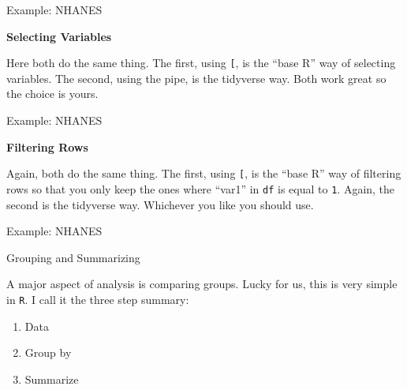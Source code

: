 \documentclass[ignorenonframetext,]{beamer}
\newenvironment{Shaded}{\begin{snugshade}}{\end{snugshade}}
\newcommand{\KeywordTok}[1]{\textcolor[rgb]{0.13,0.29,0.53}{\textbf{{#1}}}}
\newcommand{\DecValTok}[1]{\textcolor[rgb]{0.00,0.00,0.81}{{#1}}}
\newcommand{\StringTok}[1]{\textcolor[rgb]{0.31,0.60,0.02}{{#1}}}
\newcommand{\NormalTok}[1]{{#1}}
\providecommand{\tightlist}{%
\setlength{\itemsep}{0pt}\setlength{\parskip}{0pt}}
\begin{document}
\begin{frame}[fragile]{Example: NHANES}

\textbf{Selecting Variables}

\begin{Shaded}
\end{Shaded}

Here both do the same thing. The first, using \texttt{{[}}, is the
``base R'' way of selecting variables. The second, using the pipe, is
the tidyverse way. Both work great so the choice is yours.

\end{frame}

\begin{frame}[fragile]{Example: NHANES}

\textbf{Filtering Rows}

\begin{Shaded}
\end{Shaded}

Again, both do the same thing. The first, using \texttt{{[}}, is the
``base R'' way of filtering rows so that you only keep the ones where
``var1'' in \texttt{df} is equal to \texttt{1}. Again, the second is the
tidyverse way. Whichever you like you should use.

\end{frame}

\begin{frame}[fragile]{Example: NHANES}

\begin{block}{Grouping and Summarizing}

A major aspect of analysis is comparing groups. Lucky for us, this is
very simple in \texttt{R}. I call it the three step summary:

\begin{enumerate}
\def\labelenumi{\arabic{enumi}.}
\tightlist
\item
  Data
\item
  Group by
\item
  Summarize
\end{enumerate}

\end{block}

\end{frame}
\end{document}
